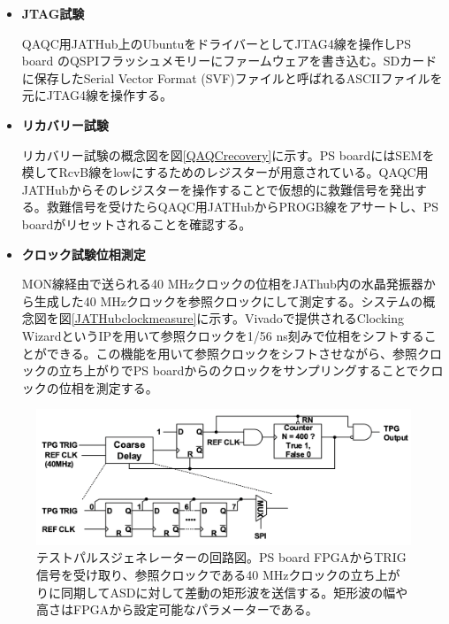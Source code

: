 \begin{itemize}
    \item \textbf{JTAG試験}\par
    QAQC用JATHub上のUbuntuをドライバーとしてJTAG4線を操作しPS board のQSPIフラッシュメモリーにファームウェアを書き込む。SDカードに保存したSerial Vector Format (SVF)ファイルと呼ばれるASCIIファイルを元にJTAG4線を操作する。
    \baselineskip

    \item \textbf{リカバリー試験}\par
    リカバリー試験の概念図を図\ref{QAQCrecovery}に示す。PS boardにはSEMを模してRcvB線をlowにするためのレジスターが用意されている。QAQC用JATHubからそのレジスターを操作することで仮想的に救難信号を発出する。救難信号を受けたらQAQC用JATHubからPROGB線をアサートし、PS boardがリセットされることを確認する。
    \baselineskip
    
    \item \textbf{クロック試験位相測定}\par
    MON線経由で送られる40 MHzクロックの位相をJAThub内の水晶発振器から生成した40 MHzクロックを参照クロックにして測定する。システムの概念図を図\ref{JATHubclockmeasure}\cite{mt_atanaka}に示す。Vivadoで提供されるClocking WizardというIPを用いて参照クロックを1/56 ns刻みで位相をシフトすることができる。この機能を用いて参照クロックをシフトさせながら、参照クロックの立ち上がりでPS boardからのクロックをサンプリングすることでクロックの位相を測定する。
    \baselineskip
　
\end{itemize}



\begin{figure} 
\centering
\includegraphics[width=16cm]{fig/QAQC/PSBtpg.png}
\caption[テストパルスジェネレーターの回路図]{テストパルスジェネレーターの回路図。PS board FPGAからTRIG信号を受け取り、参照クロックである40 MHzクロックの立ち上がりに同期してASDに対して差動の矩形波を送信する。矩形波の幅や高さはFPGAから設定可能なパラメーターである。}
\label{PSBtpg}
\end{figure}

